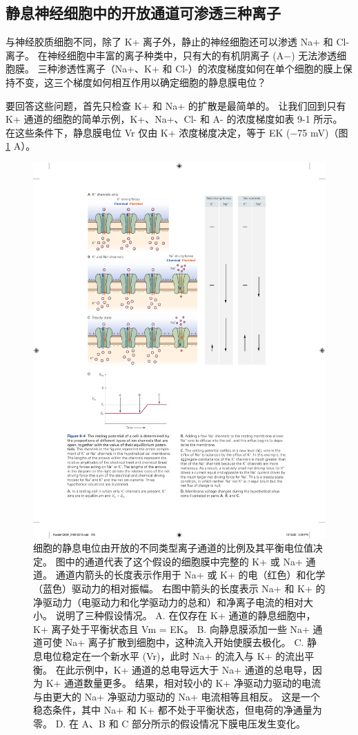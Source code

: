 \subsection{静息神经细胞中的开放通道可渗透三种离子}
与神经胶质细胞不同，除了 K+ 离子外，静止的神经细胞还可以渗透 Na+ 和 Cl- 离子。 
在神经细胞中丰富的离子种类中，只有大的有机阴离子 (A−) 无法渗透细胞膜。 
三种渗透性离子（Na+、K+ 和 Cl-）的浓度梯度如何在单个细胞的膜上保持不变，这三个梯度如何相互作用以确定细胞的静息膜电位？


要回答这些问题，首先只检查 K+ 和 Na+ 的扩散是最简单的。 
让我们回到只有 K+ 通道的细胞的简单示例，K+、Na+、Cl- 和 A- 的浓度梯度如表 9-1 所示。 
在这些条件下，静息膜电位 Vr 仅由 K+ 浓度梯度决定，等于 EK (−75 mV)（图 \ref{fig:9_4} A）。

\begin{figure}[htbp]
	\centering
	\includegraphics[width=0.7\linewidth]{chap09/fig_9_4}
	\caption{细胞的静息电位由开放的不同类型离子通道的比例及其平衡电位值决定。 图中的通道代表了这个假设的细胞膜中完整的 K+ 或 Na+ 通道。 通道内箭头的长度表示作用于 Na+ 或 K+ 的电（红色）和化学（蓝色）驱动力的相对振幅。 右图中箭头的长度表示 Na+ 和 K+ 的净驱动力（电驱动力和化学驱动力的总和）和净离子电流的相对大小。 说明了三种假设情况。 A. 在仅存在 K+ 通道的静息细胞中，K+ 离子处于平衡状态且 Vm = EK。 B. 向静息膜添加一些 Na+ 通道可使 Na+ 离子扩散到细胞中，这种流入开始使膜去极化。 C. 静息电位稳定在一个新水平 (Vr)，此时 Na+ 的流入与 K+ 的流出平衡。 在此示例中，K+ 通道的总电导远大于 Na+ 通道的总电导，因为 K+ 通道数量更多。 结果，相对较小的 K+ 净驱动力驱动的电流与由更大的 Na+ 净驱动力驱动的 Na+ 电流相等且相反。 这是一个稳态条件，其中 Na+ 和 K+ 都不处于平衡状态，但电荷的净通量为零。 D. 在 A、B 和 C 部分所示的假设情况下膜电压发生变化。}
	\label{fig:9_4}
\end{figure}


